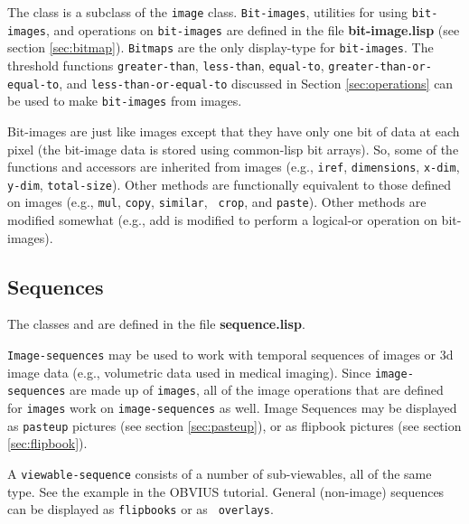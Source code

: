 The  class is a subclass of the {\tt image} class.
{\tt Bit-images}, utilities for using {\tt bit-images}, and operations
on {\tt bit-images} are defined in the file {\bf bit-image.lisp} (see
section \ref{sec:bitmap}).  {\tt Bitmaps} are the only display-type
for {\tt bit-images}.  The threshold functions {\tt greater-than},
{\tt less-than}, {\tt equal-to}, {\tt greater-than-or-equal-to}, and
{\tt less-than-or-equal-to} discussed in Section \ref{sec:operations}
can be used to make {\tt bit-images} from images.

Bit-images are just like images except that they have only one bit of
data at each pixel (the bit-image data is stored using common-lisp bit
arrays).  So, some of the functions and accessors are inherited from
images (e.g., {\tt iref}, {\tt dimensions}, {\tt x-dim}, {\tt y-dim},
{\tt total-size}).  Other methods are functionally equivalent to those
defined on images (e.g., {\tt mul}, {\tt copy}, {\tt similar}, {\tt
crop}, and {\tt paste}).  Other methods are modified somewhat (e.g.,
add is modified to perform a logical-or operation on bit-images).  


\subsection{Sequences}
\label{sec:sequence}

The classes  and  are defined
in the file {\bf sequence.lisp}.  

{\tt Image-sequences} may be used to work with temporal sequences of
images or 3d image data (e.g., volumetric data used in medical
imaging).  Since {\tt image-sequences} are made up of {\tt images},
all of the image operations that are defined for {\tt images} work on
{\tt image-sequences} as well.  Image Sequences may be displayed as
{\tt pasteup} pictures (see section \ref{sec:pasteup}), or as flipbook
pictures (see section \ref{sec:flipbook}).  

A {\tt viewable-sequence} consists of a number of sub-viewables, all
of the same type.  See the example in the OBVIUS tutorial.  General
(non-image) sequences can be displayed as {\tt flipbooks} or as {\tt
overlays}.




